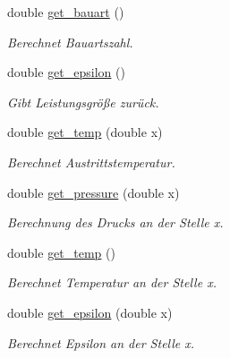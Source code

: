 \begin{DoxyCompactItemize}
double \hyperlink{class_rohrstroemung_ac4d2f31e451f1a3c97627d3a87df419d}{get\+\_\+bauart} ()
\begin{DoxyCompactList}\small\item\em Berechnet Bauartszahl. \end{DoxyCompactList}\item 
\mbox{\label{class_rohrstroemung_a47b2ddadb37169a3a21bcc914a772894}} 
double \hyperlink{class_rohrstroemung_a47b2ddadb37169a3a21bcc914a772894}{get\+\_\+epsilon} ()
\begin{DoxyCompactList}\small\item\em Gibt Leistungsgröße zurück. \end{DoxyCompactList}\item 
\mbox{\label{class_rohrstroemung_adc94a5748b40f9e47448a11e55809593}} 
double \hyperlink{class_rohrstroemung_adc94a5748b40f9e47448a11e55809593}{get\+\_\+temp} (double x)
\begin{DoxyCompactList}\small\item\em Berechnet Austrittstemperatur. \end{DoxyCompactList}\item 
\mbox{\label{class_rohrstroemung_abf6265814d9ae0d148aeecb6092d8c2f}} 
double \hyperlink{class_rohrstroemung_abf6265814d9ae0d148aeecb6092d8c2f}{get\+\_\+pressure} (double x)
\begin{DoxyCompactList}\small\item\em Berechnung des Drucks an der Stelle x. \end{DoxyCompactList}\item 
\mbox{\label{class_rohrstroemung_a46d4e8bb41a8204b96fe0420087e69ec}} 
double \hyperlink{class_rohrstroemung_a46d4e8bb41a8204b96fe0420087e69ec}{get\+\_\+temp} ()
\begin{DoxyCompactList}\small\item\em Berechnet Temperatur an der Stelle x. \end{DoxyCompactList}\item 
\mbox{\label{class_rohrstroemung_ab3a28b86a6a2d630a4c37f0054fb0288}} 
double \hyperlink{class_rohrstroemung_ab3a28b86a6a2d630a4c37f0054fb0288}{get\+\_\+epsilon} (double x)
\begin{DoxyCompactList}\small\item\em Berechnet Epsilon an der Stelle x. \end{DoxyCompactList}\item 

\end{DoxyCompactItemize}
